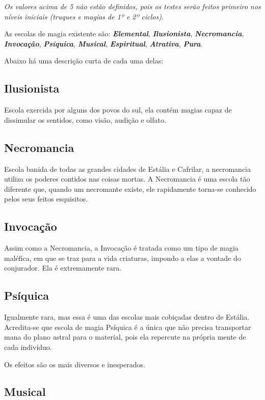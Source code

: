 \begin{multicols}{2}
\textit{Os valores acima de 5 não estão definidos, pois os testes serão feitos
primeiro nos níveis iniciais (truques e magias de 1º e 2º ciclos).}

As escolas de magia existente são: \textbf{\textit{Elemental}},
\textbf{\textit{Ilusionista}}, \textbf{\textit{Necromancia}},
\textbf{\textit{Invocação}}, \textbf{\textit{Psíquica}},
\textbf{\textit{Musical}}, \textbf{\textit{Espiritual}},
\textbf{\textit{Atrativa}}, \textbf{\textit{Pura}}.

Abaixo há uma descrição curta de cada uma delas:

\subsection*{Ilusionista}%

Escola exercida por alguns dos povos do sul, ela contém magias capaz de
dissimular os sentidos, como visão, audição e olfato.

\subsection*{Necromancia}%

Escola banida de todas as grandes cidades de Estália e Cafrilar, a necromancia
utiliza os poderes contidos nas coisas mortas. A Necromancia é uma escola tão
diferente que, quando um necromante existe, ele rapidamente torna-se conhecido
pelos seus feitos esquisitos.

\subsection*{Invocação}%

Assim como a Necromancia, a Invocação é tratada como um tipo de magia maléfica,
em que se traz para a vida criaturas, impondo a elas a vontade do conjurador.
Ela é extremamente rara.

\subsection*{Psíquica}%

Igualmente rara, mas essa é uma das escolas mais cobiçadas dentro de Estália.
Acredita-se que escola de magia Psíquica é a única que não precisa transportar
mana do plano astral para o material, pois ela repercute na própria mente de
cada indivíduo.

Os efeitos são os mais diversos e inesperados.

\subsection*{Musical}%


\end{multicols}
